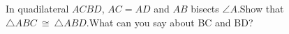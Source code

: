 In quadilateral $ACBD$, $AC = AD$ and $AB$ bisects $\angle{A}$.Show that $\triangle ABC \  \cong \  \triangle  ABD$.What can you say about BC and BD?

